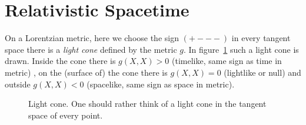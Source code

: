\section{Relativistic Spacetime}

On a Lorentzian metric, here we choose the sign $(+---)$ in every tangent space
there is a \textit{light cone} defined by the metric $g$.
In figure~\ref{fig:lightCone} such a light cone is drawn.
Inside the cone there is $g(X,X)>0$ (timelike, same sign as time in metric)
, on the (surface of) the cone there is
$g(X,X)=0$ (lightlike or null) and outside $g(X,X)<0$ (spacelike, same sign as space
in metric).
\begin{figure}[tbh]
    \centering\def\svgwidth{\columnwidth}
    
    \caption{Light cone. One should rather think of a light cone in the tangent space of every
    point.}
    \label{fig:lightCone}
\end{figure}

